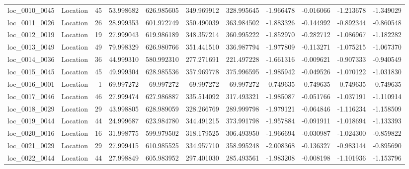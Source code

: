 \begin{tabular}{llrrrrrrrrr}
loc_0010_0045 &        Location &              45 &  53.998682 & 626.985605 &  349.969912 &    328.995645 &  -1.966478 &  -0.016066 &   -1.213678 &     -1.349029 \\
loc_0011_0026 &        Location &              26 &  28.999353 & 601.972749 &  350.490039 &    363.984502 &  -1.883326 &  -0.144992 &   -0.892344 &     -0.860548 \\
loc_0012_0019 &        Location &              19 &  27.999043 & 619.986189 &  348.357214 &    360.995222 &  -1.852970 &  -0.282712 &   -1.086967 &     -1.182282 \\
loc_0013_0049 &        Location &              49 &  79.998329 & 626.980766 &  351.441510 &    336.987794 &  -1.977809 &  -0.113271 &   -1.075215 &     -1.067370 \\
loc_0014_0036 &        Location &              36 &  44.999310 & 580.992310 &  277.271691 &    221.497228 &  -1.661316 &  -0.009621 &   -0.907333 &     -0.940549 \\
loc_0015_0045 &        Location &              45 &  49.999304 & 628.985536 &  357.969778 &    375.996595 &  -1.985942 &  -0.049526 &   -1.070122 &     -1.031830 \\
loc_0016_0001 &        Location &               1 &  69.997272 &  69.997272 &   69.997272 &     69.997272 &  -0.749635 &  -0.749635 &   -0.749635 &     -0.749635 \\
loc_0017_0046 &        Location &              46 &  27.999474 & 627.986887 &  335.514092 &    317.493321 &  -1.985087 &  -0.051766 &   -1.037191 &     -1.110914 \\
loc_0018_0029 &        Location &              29 &  43.998805 & 628.989059 &  328.266769 &    289.999798 &  -1.979121 &  -0.064846 &   -1.116234 &     -1.158509 \\
loc_0019_0044 &        Location &              44 &  24.999687 & 623.984780 &  344.491215 &    373.991798 &  -1.957884 &  -0.091911 &   -1.018694 &     -1.133393 \\
loc_0020_0016 &        Location &              16 &  31.998775 & 599.979502 &  318.179525 &    306.493950 &  -1.966694 &  -0.030987 &   -1.024300 &     -0.859822 \\
loc_0021_0029 &        Location &              29 &  27.999415 & 610.985525 &  334.957710 &    358.995248 &  -2.008368 &  -0.136327 &   -0.983144 &     -0.895690 \\
loc_0022_0044 &        Location &              44 &  27.998849 & 605.983952 &  297.401030 &    285.493561 &  -1.983208 &  -0.008198 &   -1.101936 &     -1.153796 \\

\end{tabular}
